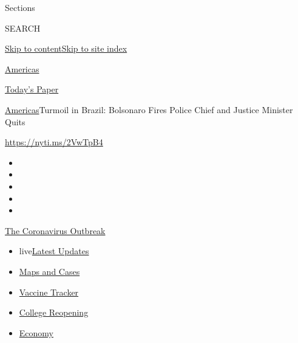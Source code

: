 Sections

SEARCH

\protect\hyperlink{site-content}{Skip to
content}\protect\hyperlink{site-index}{Skip to site index}

\href{https://www.nytimes.com/section/world/americas}{Americas}

\href{https://myaccount.nytimes.com/auth/login?response_type=cookie\&client_id=vi}{}

\href{https://www.nytimes.com/section/todayspaper}{Today's Paper}

\href{/section/world/americas}{Americas}\textbar{}Turmoil in Brazil:
Bolsonaro Fires Police Chief and Justice Minister Quits

\url{https://nyti.ms/2VwTpB4}

\begin{itemize}
\item
\item
\item
\item
\item
\end{itemize}

\href{https://www.nytimes.com/news-event/coronavirus?action=click\&pgtype=Article\&state=default\&region=TOP_BANNER\&context=storylines_menu}{The
Coronavirus Outbreak}

\begin{itemize}
\tightlist
\item
  live\href{https://www.nytimes.com/2020/08/04/world/coronavirus-cases.html?action=click\&pgtype=Article\&state=default\&region=TOP_BANNER\&context=storylines_menu}{Latest
  Updates}
\item
  \href{https://www.nytimes.com/interactive/2020/us/coronavirus-us-cases.html?action=click\&pgtype=Article\&state=default\&region=TOP_BANNER\&context=storylines_menu}{Maps
  and Cases}
\item
  \href{https://www.nytimes.com/interactive/2020/science/coronavirus-vaccine-tracker.html?action=click\&pgtype=Article\&state=default\&region=TOP_BANNER\&context=storylines_menu}{Vaccine
  Tracker}
\item
  \href{https://www.nytimes.com/2020/08/02/us/covid-college-reopening.html?action=click\&pgtype=Article\&state=default\&region=TOP_BANNER\&context=storylines_menu}{College
  Reopening}
\item
  \href{https://www.nytimes.com/live/2020/08/04/business/stock-market-today-coronavirus?action=click\&pgtype=Article\&state=default\&region=TOP_BANNER\&context=storylines_menu}{Economy}
\end{itemize}

